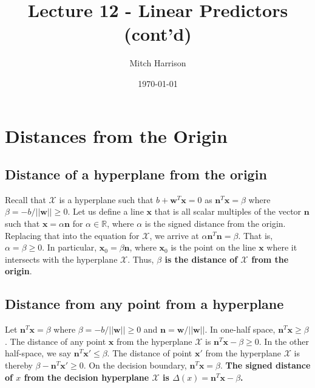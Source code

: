 \documentclass[titlepage, 12pt, leqno]{article}
\title{\Huge{Lecture 12 - Linear Predictors (cont'd)}}
\author{\large{Mitch Harrison}}
\date{\today}
\begin{document}
\setlength{\parskip}{1\baselineskip}
\setlength{\parindent}{15pt}
\maketitle
\tableofcontents
\newpage


\section{Distances from the Origin}

\subsection{Distance of a hyperplane from the origin}
Recall that $\mathcal{X}$ is a hyperplane such that $b + \textbf{w}^{T}\textbf{x}=0$ as
$\textbf{n}^{T}\textbf{x}=\beta$ where $\beta = -b/||\textbf{w}||\ge 0$. Let us define
a line $\textbf{x}$ that is all scalar multiples of the vector $\textbf{n}$ such that
$\textbf{x} = \alpha \textbf{n}$ for $\alpha \in \mathbb{R}$, where $\alpha$ is the
signed distance from the origin. Replacing that into the equation for $\mathcal{X}$, we
arrive at $\alpha \textbf{n}^{T}\textbf{n}=\beta$. That is, $\alpha = \beta\ge0$. In
particular, $\textbf{x}_{0}=\beta \textbf{n}$, where $\textbf{x}_{0}$ is the point on 
the line $\textbf{x}$ where it intersects with the hyperplane $\mathcal{X}$. Thus,
\textbf{ $\beta$ is the distance of $\mathcal{X}$ from the origin}.

\subsection{Distance from any point from a hyperplane}
Let $\textbf{n}^{T}\textbf{x} = \beta$ where $\beta = -b/||\textbf{w}|| \ge 0$ and
$\textbf{n} = \textbf{w}/||\textbf{w}||$. In one-half space, $\textbf{n}^{T}\textbf{x}
\ge \beta$. The distance of any point $\textbf{x}$ from the hyperplane $\mathcal{X}$ is
$\textbf{n}^{T}\textbf{x} - \beta \ge 0$. In the other half-space, we say 
$\textbf{n}^{T}\textbf{x}' \le \beta$. The distance of point $\textbf{x}'$ from 
the hyperplane $\mathcal{X}$ is thereby $\beta - \textbf{n}^{T}\textbf{x}'\ge 0$. On the
decision boundary, $\textbf{n}^{T}\textbf{x}=\beta$. \textbf{The signed distance of $x$
from the decision hyperplane $\mathcal{X}$ is $\Delta(x) = \textbf{n}^{T}\textbf{x}
-\beta$.}
\end{document}
